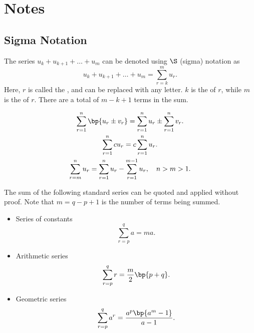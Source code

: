 \section{Notes}

\subsection{Sigma Notation}

\begin{definition}
    The series $u_k + u_{k+1} + \dots + u_m$ can be denoted using $\S$ (sigma) notation as \[u_k + u_{k+1} + \dots + u_m = \sum_{r=k}^m u_r.\] Here, $r$ is called the , and can be replaced with any letter. $k$ is the  of $r$, while $m$ is the  of $r$. There are a total of $m - k + 1$ terms in the sum.
\end{definition}

\begin{fact}
    \begin{gather*}
        \sum_{r = 1}^n \bp{u_r \pm v_r} = \sum_{r = 1}^n u_r \pm \sum_{r = 1}^n v_r.\\
        \sum_{r = 1}^n cu_r = c\sum_{r = 1}^n u_r.\\
        \sum_{r = m}^n u_r = \sum_{r = 1}^n u_r - \sum_{r = 1}^{m-1} u_r, \quad n > m > 1.
    \end{gather*}
\end{fact}

\begin{fact}
    The sum of the following standard series can be quoted and applied without proof. Note that $m = q - p + 1$ is the number of terms being summed.

    \begin{itemize}
        \item Series of constants \[\sum_{r = p}^q a = ma.\]
        \item Arithmetic series \[\sum_{r = p}^q r = \frac{m}{2} \bp{p + q}.\]
        \item Geometric series \[\sum_{r = p}^q a^r = \frac{a^p \bp{a^m - 1}}{a - 1}.\]
    \end{itemize}
\end{fact}
